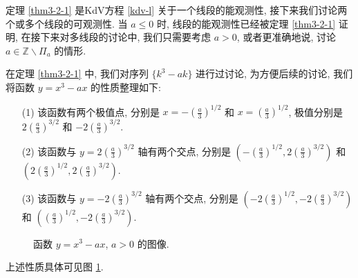 \documentclass[master]{cugthesis}
\newcommand\Z{\ensuremath{\mathbb{Z}}}
\begin{document}
    定理 \ref{thm3-2-1} 是KdV方程 \eqref{kdv-l} 关于一个线段的能观测性, 接下来我们讨论两个或多个线段的可观测性. 当 $a\le 0$ 时, 线段的能观测性已经被定理 \ref{thm3-2-1} 证明, 在接下来对多线段的讨论中, 我们只需要考虑 $ a>0 $, 或者更准确地说, 讨论 $a\in \Z \backslash \Pi_a$ 的情形. 
    
    在定理 \ref{thm3-2-1} 中, 我们对序列 $\lbrace k^3-ak\rbrace$ 进行过讨论, 为方便后续的讨论, 我们将函数 $y=x^3-ax$ 的性质整理如下:
    \begin{enumerate}
        \item [(1)] 该函数有两个极值点, 分别是 $x=-\left(\frac{a}{3}\right)^{1 /2}$ 和 $x=\left(\frac{a}{3}\right)^{1 /2}$, 极值分别是 $2\left(\frac{a}{3}\right)^{3 /2}$ 和 $-2\left(\frac{a}{3}\right)^{3 /2}$. 
        \item[(2)] 该函数与 $y=2\left(\frac{a}{3}\right)^{3 /2}$ 轴有两个交点, 分别是 $\left(-\left(\frac{a}{3}\right)^{1 /2},2\left(\frac{a}{3}\right)^{3 /2}\right)$ 和 $\left(2\left(\frac{a}{3}\right)^{1 /2},2\left(\frac{a}{3}\right)^{3 /2}\right)$.
        \item[(3)] 该函数与 $y=-2\left(\frac{a}{3}\right)^{3 /2}$ 轴有两个交点, 分别是 $\left(-2\left(\frac{a}{3}\right)^{1 /2},-2\left(\frac{a}{3}\right)^{3 /2}\right)$ 和 $\left(\left(\frac{a}{3}\right)^{1 /2},-2\left(\frac{a}{3}\right)^{3 /2}\right)$.
    \end{enumerate}
    \begin{figure}[ht]
        \centering
        \caption{函数 $y=x^3-ax$, $a>0$ 的图像.}
        \label{fig5}
    \end{figure}
    上述性质具体可见图 \ref{fig5}. 
\end{document}
